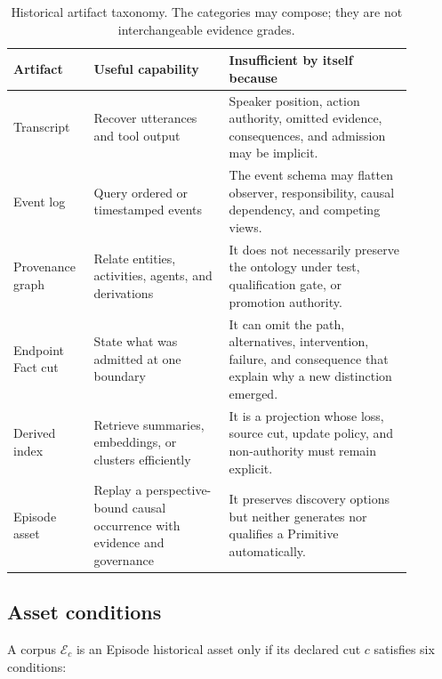 \begin{table}[ht]
\centering
\small
\begin{tabular}{p{0.16\linewidth}p{0.31\linewidth}p{0.42\linewidth}}
\toprule
Artifact & Useful capability & Insufficient by itself because \\
\midrule
Transcript & Recover utterances and tool output & Speaker position, action
authority, omitted evidence, consequences, and admission may be implicit. \\
Event log & Query ordered or timestamped events & The event schema may flatten
observer, responsibility, causal dependency, and competing views. \\
Provenance graph & Relate entities, activities, agents, and derivations & It
does not necessarily preserve the ontology under test, qualification gate, or
promotion authority. \\
Endpoint Fact cut & State what was admitted at one boundary & It can omit the
path, alternatives, intervention, failure, and consequence that explain why a
new distinction emerged. \\
Derived index & Retrieve summaries, embeddings, or clusters efficiently & It
is a projection whose loss, source cut, update policy, and non-authority must
remain explicit. \\
Episode asset & Replay a perspective-bound causal occurrence with evidence and
governance & It preserves discovery options but neither generates nor
qualifies a Primitive automatically. \\
\bottomrule
\end{tabular}
\caption{Historical artifact taxonomy. The categories may compose; they are
not interchangeable evidence grades.}
\label{tab:taxonomy}
\end{table}

\subsection{Asset conditions}

A corpus $\mathcal{E}_c$ is an Episode historical asset only if its declared
cut $c$ satisfies six conditions:

